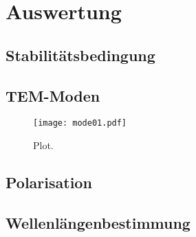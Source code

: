 \section{Auswertung}
\label{sec:Auswertung}



\subsection{Stabilitätsbedingung}
\label{subsec:Stabil}

\subsection{TEM-Moden}
\label{subsec:tem}

\begin{figure}
  \centering
  \texttt{[image: mode01.pdf]}
  \caption{Plot.}
  \label{fig:plot}
\end{figure}


\subsection{Polarisation}
\label{subsec:Polarisation}

\subsection{Wellenlängenbestimmung}
\label{subsec:
}
